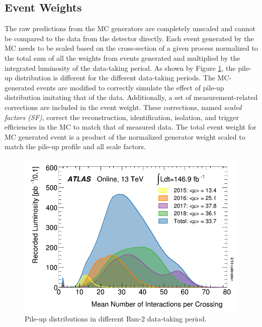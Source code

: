 \subsection{Event Weights}
\label{subsec:EventWt}

The raw predictions from the MC generators are completely unscaled and cannot be compared to the data from the detector directly. Each event generated by the MC needs to be scaled based on the cross-section of a given process normalized to the total sum of all the weights from events generated and multiplied by the integrated luminosity of the data-taking period. As shown by Figure \ref{fig:PileupDiffRuns}, the pile-up distribution is different for the different data-taking periods. The MC-generated events are modified to correctly simulate the effect of pile-up distribution imitating that of the data. Additionally, a set of measurement-related corrections are included in the event weight. These corrections, named \textit{ scaled factors (SF)}, correct the reconstruction, identification, isolation, and trigger efficiencies in the MC to match that of measured data. The total event weight for MC generated event is a product of the normalized generator weight scaled to match the pile-up profile and all scale factors.

\begin{figure}
\centering
\includegraphics[width=.8\linewidth]{figures/AnalysisOverview/mu_ProfileRun2.pdf}
\caption{Pile-up distributions in different Run-2 data-taking period.\label{fig:PileupDiffRuns} \cite{ATLASRun2DataTaking}}
\end{figure}
